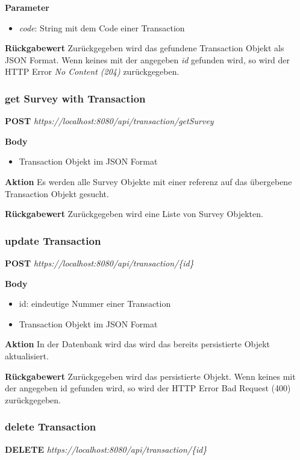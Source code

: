 \textbf{Parameter}
\begin{itemize}
    \item \emph{code}: String mit dem Code einer Transaction
\end{itemize}

\textbf{Rückgabewert}
Zurückgegeben wird das gefundene Transaction Objekt als JSON Format. Wenn keines mit der angegeben \emph{id} gefunden wird, so wird der
HTTP Error \emph{No Content (204)} zurückgegeben.

\subsubsection{get Survey with Transaction}
\textbf{POST} \emph{https://localhost:8080/api/transaction/getSurvey}

\textbf{Body}
\begin{itemize}
    \item Transaction Objekt im JSON Format
\end{itemize}

\textbf{Aktion}
Es werden alle Survey Objekte mit einer referenz auf das übergebene Transaction Objekt gesucht.

\textbf{Rückgabewert}
Zurückgegeben wird eine Liste von Survey Objekten.

\subsubsection{update Transaction}
\textbf{POST} \emph{https://localhost:8080/api/transaction/\{id\}}

\textbf{Body}
\begin{itemize}
    \item id: eindeutige Nummer einer Transaction
    \item Transaction Objekt im JSON Format
\end{itemize}

\textbf{Aktion}
In der Datenbank wird das wird das bereits persistierte Objekt aktualisiert.

\textbf{Rückgabewert}
Zurückgegeben wird das persistierte Objekt. Wenn keines mit der angegeben id gefunden wird, so wird der HTTP Error Bad Request
(400) zurückgegeben.

\subsubsection{delete Transaction}
\textbf{DELETE} \emph{https://localhost:8080/api/transaction/\{id\}}

